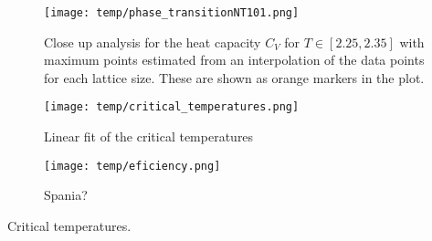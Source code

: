 \begin{figure}[!ht]
    \texttt{[image: temp/phase\_transitionNT101.png]} 
    \caption{Close up analysis for the heat capacity $C_V$ for $T\in[2.25, 2.35]$ with maximum points estimated from an interpolation of the data points for each lattice size. These are shown as orange markers in the plot.}
    \label{fig:phase_transition_zoomed}
\end{figure} 

\begin{figure}[!ht]
    \texttt{[image: temp/critical\_temperatures.png]} 
    \caption{Linear fit of the critical temperatures}
    \label{fig:critical_temperatures}
\end{figure} 

\begin{figure}[!ht]
    \texttt{[image: temp/eficiency.png]} 
    \caption{Spania?}
    \label{fig:efficiency}
\end{figure} 





\begin{table}[!ht]
    
    \caption{Critical temperatures.}
    \label{tab:critical_temperatures}
\end{table}

